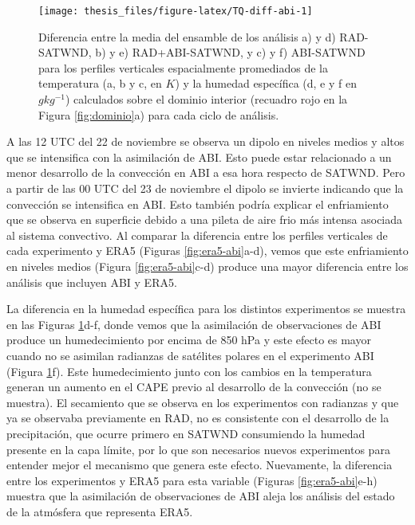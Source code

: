 \documentclass[12pt,oneside,a4paper]{reedthesis}
\begin{document}
\begin{figure}

\texttt{[image: thesis\_files/figure-latex/TQ-diff-abi-1]} \hfill{}

\caption{Diferencia entre la media del ensamble de los análisis a) y d) RAD-SATWND, b) y e) RAD+ABI-SATWND, y c) y f) ABI-SATWND para los perfiles verticales espacialmente promediados de la temperatura (a, b y c, en \(K\)) y la humedad específica (d, e y f en \(gkg^{-1}\)) calculados sobre el dominio interior (recuadro rojo en la Figura \ref{fig:dominio}a) para cada ciclo de análisis.}\label{fig:TQ-diff-abi}
\end{figure}
A las 12 UTC del 22 de noviembre se observa un dipolo en niveles medios y altos que se intensifica con la asimilación de ABI. Esto puede estar relacionado a un menor desarrollo de la convección en ABI a esa hora respecto de SATWND. Pero a partir de las 00 UTC del 23 de noviembre el dipolo se invierte indicando que la convección se intensifica en ABI. Esto también podría explicar el enfriamiento que se observa en superficie debido a una pileta de aire frio más intensa asociada al sistema convectivo.
Al comparar la diferencia entre los perfiles verticales de cada experimento y ERA5 (Figuras \ref{fig:era5-abi}a-d), vemos que este enfriamiento en niveles medios (Figura \ref{fig:era5-abi}c-d) produce una mayor diferencia entre los análisis que incluyen ABI y ERA5.

La diferencia en la humedad específica para los distintos experimentos se muestra en las Figuras \ref{fig:TQ-diff-abi}d-f, donde vemos que la asimilación de observaciones de ABI produce un humedecimiento por encima de 850 hPa y este efecto es mayor cuando no se asimilan radianzas de satélites polares en el experimento ABI (Figura \ref{fig:TQ-diff-abi}f). Este humedecimiento junto con los cambios en la temperatura generan un aumento en el CAPE previo al desarrollo de la convección (no se muestra). El secamiento que se observa en los experimentos con radianzas y que ya se observaba previamente en RAD, no es consistente con el desarrollo de la precipitación, que ocurre primero en SATWND consumiendo la humedad presente en la capa límite, por lo que son necesarios nuevos experimentos para entender mejor el mecanismo que genera este efecto. Nuevamente, la diferencia entre los experimentos y ERA5 para esta variable (Figuras \ref{fig:era5-abi}e-h) muestra que la asimilación de observaciones de ABI aleja los análisis del estado de la atmósfera que representa ERA5.
\end{document}
